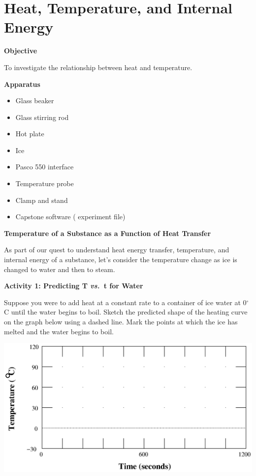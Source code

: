 
\section{Heat, Temperature, and Internal Energy}

\makelabheader %

\textbf{Objective}

To investigate the relationship between heat and temperature.

\textbf{Apparatus}

\begin{itemize}
\item Glass beaker 
\item Glass stirring rod
\item Hot plate
\item Ice
\item Pasco 550 interface
\item Temperature probe
\item Clamp and stand
\item Capstone software ( experiment file)
\end{itemize}
\textbf{Temperature of a Substance as a Function of Heat Transfer}

As part of our quest to understand heat energy transfer, temperature,
and internal energy of a substance, let's consider the temperature
change as ice is changed to water and then to steam.

\textbf{Activity 1: Predicting T \textit{vs.}~t for Water} 

Suppose you were to add heat at a constant rate to a container of
ice water at 0\( ^{\circ } \)C until the water begins to boil. Sketch
the predicted shape of the heating curve on the graph below using
a dashed line. Mark the points at which the ice has melted and the
water begins to boil.

\vspace{0.3cm}
{\centering \includegraphics{heat_temp_int_energy/heat_temp_int_energy_fig_1.eps} \par}
\vspace{0.3cm}

